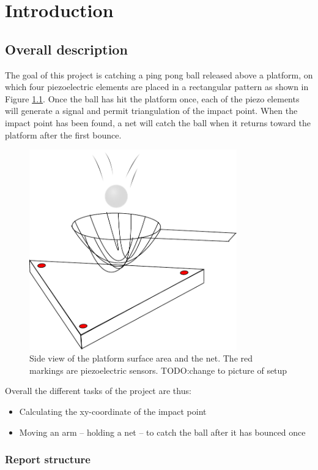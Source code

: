 \chapter{Introduction}
\label{chap:introduction}

\section{Overall description}
The goal of this project is catching a ping pong ball released above a platform, on which four piezoelectric elements are placed in a rectangular pattern as shown in Figure \ref{fig:sideview}. Once the ball has hit the platform once, each of the piezo elements will generate a signal and permit triangulation of the impact point. When the impact point has been found, a net will catch the ball when it returns toward the platform after the first bounce.

\begin{figure}[htb]
	\centering
	\includegraphics[width=0.8\textwidth]{figures/sideview}
	\caption{Side view of the platform surface area and the net. The red markings are piezoelectric sensors. TODO:change to picture of setup}
	\label{fig:sideview}
\end{figure}

Overall the different tasks of the project are thus:
\begin{itemize}
	\item Calculating the xy-coordinate of the impact point
	\item Moving an arm -- holding a net -- to catch the ball after it has bounced once
\end{itemize}

\subsection{Report structure}
